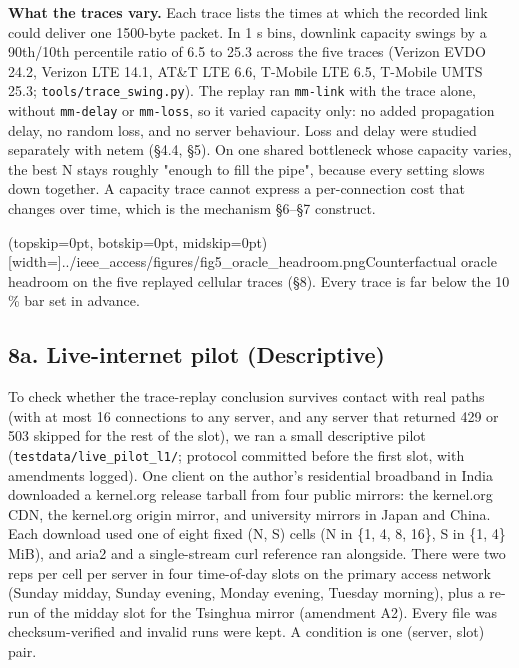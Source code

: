 \documentclass{ieeeaccess}
\begin{document}
\textbf{What the traces vary.} Each trace lists the times at which the recorded link could deliver one 1500-byte packet. In 1 s bins, downlink capacity swings by a 90th/10th percentile ratio of 6.5 to 25.3 across the five traces (Verizon EVDO 24.2, Verizon LTE 14.1, AT\&T LTE 6.6, T-Mobile LTE 6.5, T-Mobile UMTS 25.3; \texttt{tools/\allowbreak{}trace\_swing.py}). The replay ran \texttt{mm-link} with the trace alone, without \texttt{mm-delay} or \texttt{mm-loss}, so it varied capacity only: no added propagation delay, no random loss, and no server behaviour. Loss and delay were studied separately with netem (§4.4, §5). On one shared bottleneck whose capacity varies, the best N stays roughly "enough to fill the pipe", because every setting slows down together. A capacity trace cannot express a per-connection cost that changes over time, which is the mechanism §6–§7 construct.


\Figure[t!](topskip=0pt, botskip=0pt, midskip=0pt)[width=\columnwidth]{../ieee_access/figures/fig5_oracle_headroom.png}{Counterfactual oracle headroom on the five replayed cellular traces (§8). Every trace is far below the 10 \% bar set in advance.}

\subsection*{8a. Live-internet pilot (Descriptive)}

To check whether the trace-replay conclusion survives contact with real paths (with at most 16 connections to any server, and any server that returned 429 or 503 skipped for the rest of the slot), we ran a small descriptive pilot (\texttt{testdata/\allowbreak{}live\_pilot\_l1/\allowbreak{}}; protocol committed before the first slot, with amendments logged). One client on the author's residential broadband in India downloaded a kernel.org release tarball from four public mirrors: the kernel.org CDN, the kernel.org origin mirror, and university mirrors in Japan and China. Each download used one of eight fixed (N, S) cells (N in \{1, 4, 8, 16\}, S in \{1, 4\} MiB), and aria2 and a single-stream curl reference ran alongside. There were two reps per cell per server in four time-of-day slots on the primary access network (Sunday midday, Sunday evening, Monday evening, Tuesday morning), plus a re-run of the midday slot for the Tsinghua mirror (amendment A2). Every file was checksum-verified and invalid runs were kept. A condition is one (server, slot) pair.
\end{document}
